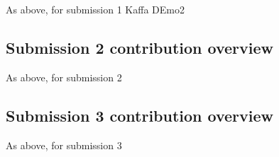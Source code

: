 \documentclass[a4paper, 11pt]{report}
\begin{document}
As above, for submission 1 Kaffa DEmo2

\subsection{Submission 2 contribution overview}

As above, for submission 2

\subsection{Submission 3 contribution overview}

As above, for submission 3 



\newpage



\end{document}
